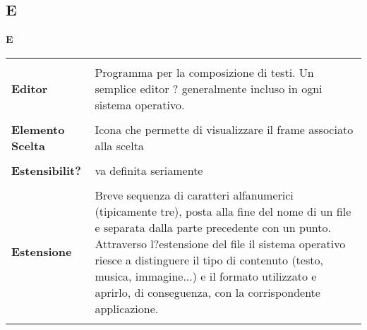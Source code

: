 {\subsection{E} 
\hfill\Huge{\textbf{E}} \\ 
\normalsize 
\begin{longtabu} to 
\toprule \\ 
\textbf{Editor} & Programma per la composizione di testi. Un semplice editor ? generalmente incluso in ogni sistema operativo. \\ 
 \\ 
\textbf{Elemento Scelta} & Icona che permette di visualizzare il frame associato alla scelta \\ 
 \\ 
\textbf{Estensibilit?} & va definita seriamente \\ 
 \\ 
\textbf{Estensione} & Breve sequenza di caratteri alfanumerici (tipicamente tre), posta alla fine del nome di un file e separata dalla parte precedente con un punto. Attraverso l?estensione del file il sistema operativo riesce a distinguere il tipo di contenuto (testo, musica, immagine...) e il formato utilizzato e aprirlo, di conseguenza, con la corrispondente applicazione. \\ 
 \\ 
\end{longtabu} 
\newpage 
}
